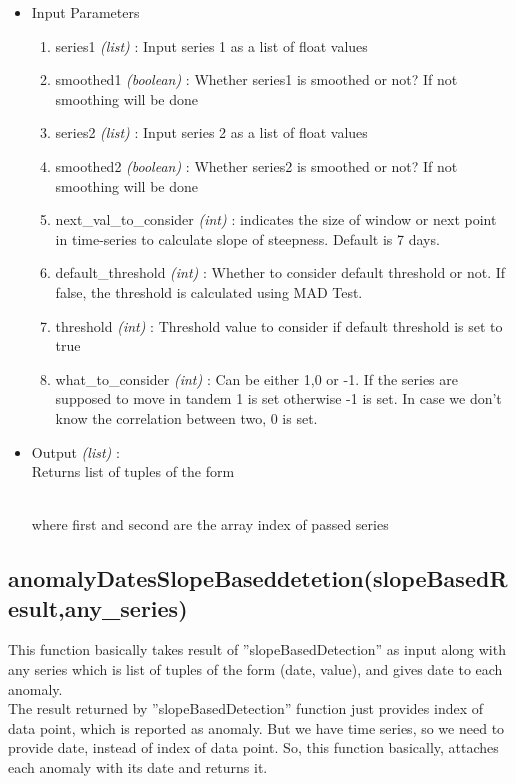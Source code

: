 \begin{itemize}
 \item Input Parameters
 
 \begin{enumerate}
  \item series1 \textit{(list)} : Input series 1 as a list of float values
  \item smoothed1 \textit{(boolean)} : Whether series1 is smoothed or not? If not smoothing will be done
  \item series2 \textit{(list)} : Input series 2 as a list of float values
  \item smoothed2 \textit{(boolean)} : Whether series2 is smoothed or not? If not smoothing will be done
  \item next{\_}val{\_}to{\_}consider \textit{(int)} : indicates the size of window or next point in time-series to calculate slope of steepness. Default is 7 days.
  \item default{\_}threshold \textit{(int)} : Whether to consider default threshold or not. If false, the threshold is calculated using MAD Test.
  \item threshold \textit{(int)} : Threshold value to consider if default threshold is set to true
  \item what{\_}to{\_}consider \textit{(int)} : Can be either 1,0 or -1. If the series are supposed to move in tandem 1 is set otherwise -1 is set. In case we don't know the correlation between two, 0 is set.
  \end{enumerate}

 \item Output \textit{(list)} : \\
  Returns list of tuples of the form \\
  \\
  \begin{flushleft}
 where first and second are the array index of passed series
 \end{flushleft}
\end{itemize}

\subsection{anomalyDatesSlopeBaseddetetion(slopeBasedResult,any\_series)}

This function basically takes result of ”slopeBasedDetection” as input along with
any series which is list of tuples of the form (date, value), and gives date to each
anomaly.\\
The result returned by ”slopeBasedDetection” function just provides index of
data point, which is reported as anomaly. But we have time series, so we need
to provide date, instead of index of data point. So, this function basically,
attaches each anomaly with its date and returns it.\\

